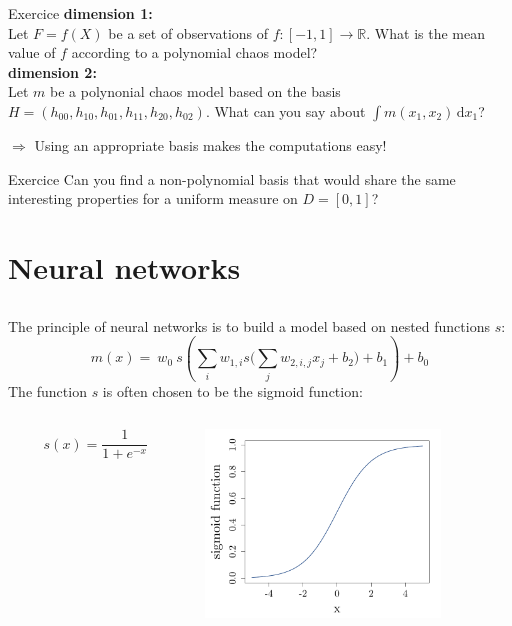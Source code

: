 \documentclass{beamer}
\newcommand\dx{\, \mathrm{d}}
\begin{document}
\begin{frame}{}
\begin{exampleblock}{Exercice}
\textbf{dimension 1:} \\ Let $F = f(X)$ be a set of observations of $f:[-1,1] \rightarrow \mathds{R}$. What is the mean value of $f$ according to a polynomial chaos model? \\ \vspace{2mm}
\textbf{dimension 2:} \\ Let $m$ be a polynonial chaos model based on the basis $H=(h_{00}, h_{10}, h_{01}, h_{11}, h_{20}, h_{02})$. What can you say about $ \int m(x_1,x_2) \dx x_1$?
\end{exampleblock}
\qquad $\Rightarrow$ Using an appropriate basis makes the computations easy!
\begin{exampleblock}{Exercice}
Can you find a non-polynomial basis that would share the same interesting properties for a uniform measure on $D=[0,1]$?
\end{exampleblock}
\end{frame}


\section{Neural networks}
\subsection{}

\begin{frame}{}
The principle of neural networks is to build a model based on nested functions $s$:
$$m(x) =  \ w_0 \  s \left( \sum_i w_{1,i} s \Big( \sum_j w_{2,i,j} x_j + b_2 \Big) + b_1 \right) + b_0 $$
The function $s$ is often chosen to be the sigmoid function:
\begin{columns}[c]
\begin{column}{3cm}
$$s(x) = \frac{1}{1+e^{-x}}$$
\end{column}
\begin{column}{7cm}
\begin{center}
  \includegraphics[height=5cm]{figures/R/neuralnet_sigmoid}
\end{center}
\end{column}
\end{columns}
\end{frame}
\end{document}
